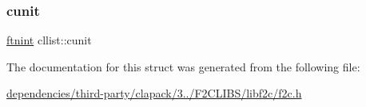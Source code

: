 \mbox{\label{structcllist_a5ecb27d52d6d1cdccf23f00e6586e4ff}} 
\subsubsection{\texorpdfstring{cunit}{cunit}}
{\footnotesize\ttfamily \hyperlink{dependencies_2third-party_2clapack_23_82_81_2_f2_c_l_i_b_s_2libf2c_2f2c_8h_a9d70cdb573fb2bf020e1f6dba85fb1cc}{ftnint} cllist\+::cunit}



The documentation for this struct was generated from the following file\+:\begin{DoxyCompactItemize}
\item 
\hyperlink{dependencies_2third-party_2clapack_23_82_81_2_f2_c_l_i_b_s_2libf2c_2f2c_8h}{dependencies/third-\/party/clapack/3../\+F2\+C\+L\+I\+B\+S/libf2c/f2c.\+h}\end{DoxyCompactItemize}
